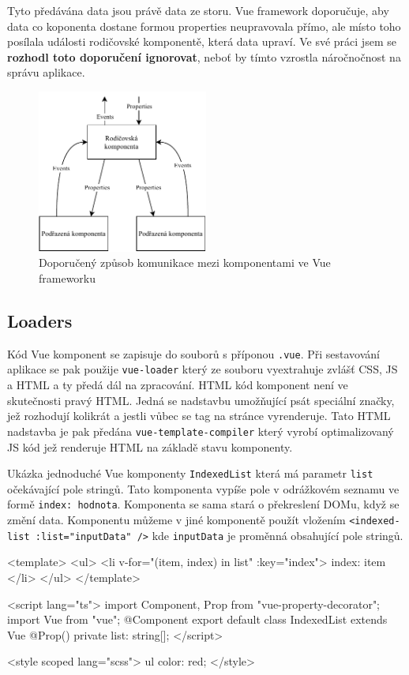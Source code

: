 Tyto předávána data jsou právě data ze storu. Vue framework doporučuje, aby data co koponenta dostane formou properties neupravovala přímo, ale místo toho posílala události rodičovské komponentě, která data upraví. Ve své práci jsem se \textbf{rozhodl toto doporučení ignorovat}, neboť by tímto vzrostla náročnočnost na správu aplikace.

\begin{figure}[h]
    \centering
    \includegraphics[width=0.5\textwidth]{media/vue.pdf}
    \caption{Doporučený způsob komunikace mezi komponentami ve Vue frameworku}
\end{figure}

\subsection{Loaders}
Kód Vue komponent se zapisuje do souborů s příponou \texttt{.vue}. Při sestavování aplikace se pak použije \texttt{vue-loader} který ze souboru vyextrahuje zvlášť CSS, JS a HTML a ty předá dál na zpracování. HTML kód komponent není ve skutečnosti pravý HTML. Jedná se nadstavbu umožňující psát speciální značky, jež rozhodují kolikrát a jestli vůbec se tag na stránce vyrenderuje. Tato HTML nadstavba je pak předána \texttt{vue-template-compiler} který vyrobí optimalizovaný JS kód jež renderuje HTML na základě stavu komponenty.

\newpage

\begin{prikl}
Ukázka jednoduché Vue komponenty \texttt{IndexedList} která má parametr \texttt{list} očekávající pole stringů. Tato komponenta vypíše pole v odrážkovém seznamu ve formě \texttt{index: hodnota}. Komponenta se sama stará o překreslení DOMu, když se změní data. Komponentu můžeme v jiné komponentě použít vložením \texttt{<indexed-list :list="inputData" />} kde \texttt{inputData} je proměnná obsahující pole stringů.

\begin{code}
<template>
  <ul>
    <li v-for="(item, index) in list" :key="index">
      {{index}}: {{ item }}
    </li>
  </ul>
</template>

<script lang="ts">
  import {Component, Prop} from "vue-property-decorator";
  import Vue from "vue";
  @Component
  export default class IndexedList extends Vue {
    @Prop() private list: string[];
  }
</script>

<style scoped lang="scss">
  ul {
    color: red;
  }
</style>
\end{code}
\end{prikl}

